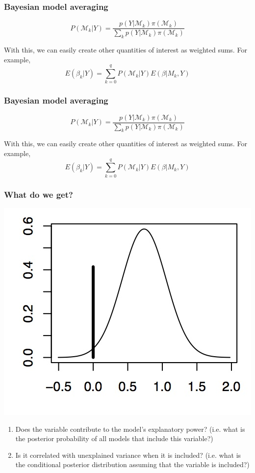 \documentclass[xcolor=dvipsnames]{beamer}
\begin{document}
\begin{frame}
\frametitle{Bayesian model averaging}

$$P(\mathcal{M}_k|Y) = \frac{p(Y| \mathcal{M}_k) \pi(\mathcal{M}_k)}{\sum_kp(Y| \mathcal{M}_k) \pi(\mathcal{M}_k)} $$

\vp \pause
With this, we can easily create other quantities of interest as
weighted sums. For example,  
$$E(\beta_k |Y) = \sum_{k=0}^q P(\mathcal{M}_k|Y) E(\beta|M_k,Y) $$

\end{frame}


\begin{frame}
\frametitle{Bayesian model averaging}

$$P(\mathcal{M}_k|Y) = \frac{p(Y| \mathcal{M}_k) \pi(\mathcal{M}_k)}{\sum_kp(Y| \mathcal{M}_k) \pi(\mathcal{M}_k)} $$

\vp \pause
With this, we can easily create other quantities of interest as
weighted sums. For example,  
$$E(\beta_k |Y) = \sum_{k=0}^q P(\mathcal{M}_k|Y) E(\beta|M_k,Y) $$

\end{frame}

\begin{frame}
\frametitle{What do we get?}

\begin{center}
\includegraphics[scale=.3]{Figure}
\end{center}

\begin{enumerate}
\item Does the variable contribute to the model’s explanatory power?
(i.e. what is the posterior probability of all models that include
this variable?)
\item  Is it correlated with unexplained variance when it is included?
(i.e. what is the conditional posterior distribution assuming
that the variable is included?)
\end{enumerate}


\end{frame}
\end{document}
